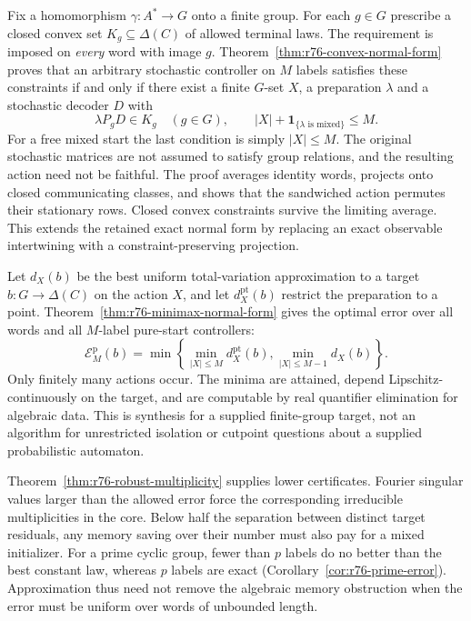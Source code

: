 Fix a homomorphism $\gamma:A^*\to G$ onto a finite group. For each
$g\in G$ prescribe a closed convex set $K_g\subseteq\Delta(C)$ of
allowed terminal laws. The requirement is imposed on \emph{every} word
with image $g$. Theorem~\ref{thm:r76-convex-normal-form} proves that an
arbitrary stochastic controller on $M$ labels satisfies these constraints
if and only if there exist a finite $G$-set $X$, a preparation $\lambda$
and a stochastic decoder $D$ with
\[
 \lambda P_gD\in K_g\quad(g\in G),\qquad
 |X|+\mathbf1_{\{\lambda\text{ is mixed}\}}\le M.
\]
For a free mixed start the last condition is simply $|X|\le M$.
The original stochastic matrices are not assumed to satisfy group
relations, and the resulting action need not be faithful. The proof
averages identity words, projects onto closed communicating classes,
and shows that the sandwiched action permutes their stationary rows.
Closed convex constraints survive the limiting average. This extends
the retained exact normal form by replacing an exact observable
intertwining with a constraint-preserving projection.

Let $d_X(b)$ be the best uniform total-variation approximation to a
target $b:G\to\Delta(C)$ on the action $X$, and let
$d_X^{\mathrm{pt}}(b)$ restrict the preparation to a point.
Theorem~\ref{thm:r76-minimax-normal-form} gives the optimal error over
all words and all $M$-label pure-start controllers:
\begin{equation}\label{eq:r76-intro-minimax}
 \mathcal E_M^{\mathrm p}(b)
 =\min\left\{\min_{|X|\le M}d_X^{\mathrm{pt}}(b),
              \min_{|X|\le M-1}d_X(b)\right\}.
\end{equation}
Only finitely many actions occur. The minima are attained, depend
Lipschitz-continuously on the target, and are computable by real
quantifier elimination for algebraic data. This is synthesis for a
supplied finite-group target, not an algorithm for unrestricted
isolation or cutpoint questions about a supplied probabilistic automaton.

Theorem~\ref{thm:r76-robust-multiplicity} supplies lower certificates.
Fourier singular values larger than the allowed error force the
corresponding irreducible multiplicities in the core. Below half the
separation between distinct target residuals, any memory saving over
their number must also pay for a mixed initializer. For a prime cyclic
group, fewer than $p$ labels do no better than the best constant law,
whereas $p$ labels are exact (Corollary~\ref{cor:r76-prime-error}).
Approximation thus need not remove the algebraic memory obstruction
when the error must be uniform over words of unbounded length.

